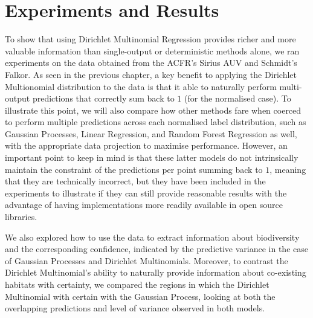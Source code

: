 \makeatletter[H]
\renewcommand{\fnum@figure}{Figure \thefigure}
\makeatother

\chapter{Experiments and Results} \label{chap:experiments}

To show that using Dirichlet Multinomial Regression provides richer and more valuable information than single-output or deterministic methods alone, we ran experiments on the data obtained from the ACFR's Sirius AUV and Schmidt's Falkor. As seen in the previous chapter, a key benefit to applying the Dirichlet Multionomial distribution to the data is that it able to naturally perform multi-output predictions that correctly sum back to $1$ (for the normalised case). To illustrate this point, we will also compare how other methods fare when coerced to perform multiple predictions across each normalised label distribution, such as Gaussian Processes, Linear Regression, and Random Forest Regression as well, with the appropriate data projection to maximise performance. However, an important point to keep in mind is that these latter models do not intrinsically maintain the constraint of the predictions per point summing back to $1$, meaning that they are technically incorrect, but they have been included in the experiments to illustrate if they can still provide reasonable results with the advantage of having implementations more readily available in open source libraries.

We also explored how to use the data to extract information about biodiversity and the corresponding confidence, indicated by the predictive variance in the case of Gaussian Processes and Dirichlet Multinomials. Moreover, to contrast the Dirichlet Multinomial's ability to naturally provide information about co-existing habitats with certainty, we compared the regions in which the Dirichlet Multinomial with certain with the Gaussian Process, looking at both the overlapping predictions and level of variance observed in both models.


